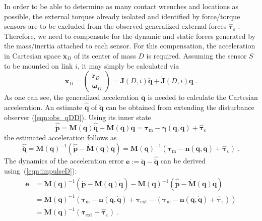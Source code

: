 In order to be able to determine as many contact wrenches and locations as possible, the external torques already isolated and identified by force/torque sensors are to be excluded from the observed generalized external forces $\hat{\bm{\tau}}_\varepsilon$ \cite{VorndammeSchToeHad2016}.
Therefore, we need to compensate for the dynamic and static forces generated by the mass/inertia attached to each sensor.
For this compensation, the acceleration in Cartesian space $\ddot{\bm{x}}_D$ of its center of mass $D$ is required.
Assuming the sensor $S$ to be mounted on link $i$, it may simply be calculated via
%
\begin{equation}
\ddot{\bm{x}}_D=\begin{pmatrix}
\ddot{\bm{r}}_D\\\dot{\bm{\omega}}_D
\end{pmatrix}=\bm{J}(D,i)\ddot{\bm{q}}+\dot{\bm{J}}(D,i)\dot{\bm{q}}\;.
\label{eqn:accel_cart}
\end{equation}
%
As one can see, the generalized acceleration $\ddot{\bm{q}}$ is needed to calculate the Cartesian acceleration.
An estimate $\hat{\ddot{\bm{q}}}$ of $\ddot{\bm{q}}$ can be obtained from extending the disturbance observer (\ref{eqn:obs_qDD}).
Using its inner state
%
\begin{equation}
\hat{\dot{\bm{p}}}=\bm{M}(\bm{q})\hat{\ddot{\bm{q}}}+\dot{\bm{M}}(\bm{q})\dot{\bm{q}}=\bm{\tau}_\mathrm{m}
 -\bm{\gamma}(\bm{q},\dot{\bm{q}})
 +\hat{\bm{\tau}}_\mathrm{\varepsilon}\label{eqn:impulseD}
\end{equation}
%
the estimated acceleration follows as
%
\begin{equation}
\hat{\ddot{\bm{q}}}=\bm{M}(\bm{q})^{-1}(\hat{\dot{\bm{p}}}-\dot{\bm{M}}(\bm{q})\dot{\bm{q}})=
\bm{M}(\bm{q})^{-1}(\bm{\tau}_\mathrm{m}-\bm{n}(\bm{q},\dot{\bm{q}})+\hat{\bm{\tau}}_\mathrm{\varepsilon})\;.
\end{equation}
%
The dynamics of the acceleration error $\bm{e}:=\ddot{\bm{q}}-\hat{\ddot{\bm{q}}}$ can be derived using~(\ref{eqn:impulseD}):
%
\begin{align}
\bm{e}&=\bm{M}(\bm{q})^{-1}(\dot{\bm{p}}-\dot{\bm{M}}(\bm{q})\dot{\bm{q}})-\bm{M}(\bm{q})^{-1}(\hat{\dot{\bm{p}}}-\dot{\bm{M}}(\bm{q})\dot{\bm{q}})\nonumber\\
&=\bm{M}(\bm{q})^{-1}(\bm{\tau}_\mathrm{m}-\bm{n}(\bm{q},\dot{\bm{q}})+\bm{\tau}_\mathrm{\mathrm{ext}}-(\bm{\tau}_\mathrm{m}-\bm{n}(\bm{q},\dot{\bm{q}})+\hat{\bm{\tau}}_\mathrm{\varepsilon}))\nonumber\\
&=\bm{M}(\bm{q})^{-1}(\bm{\tau}_\mathrm{\mathrm{ext}}-\hat{\bm{\tau}}_\mathrm{\varepsilon})\;.\label{eqn:qDD_dyn}
\end{align}
